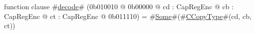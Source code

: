 function clause #\hyperref[sailMIPSzdecode]{decode}# (0b010010 @ 0b00000 @ cd : CapRegEnc @ cb : CapRegEnc @ ct : CapRegEnc @ 0b011110) = #\hyperref[sailMIPSzSome]{Some}#(#\hyperref[sailMIPSzCCopyType]{CCopyType}#(cd, cb, ct))
